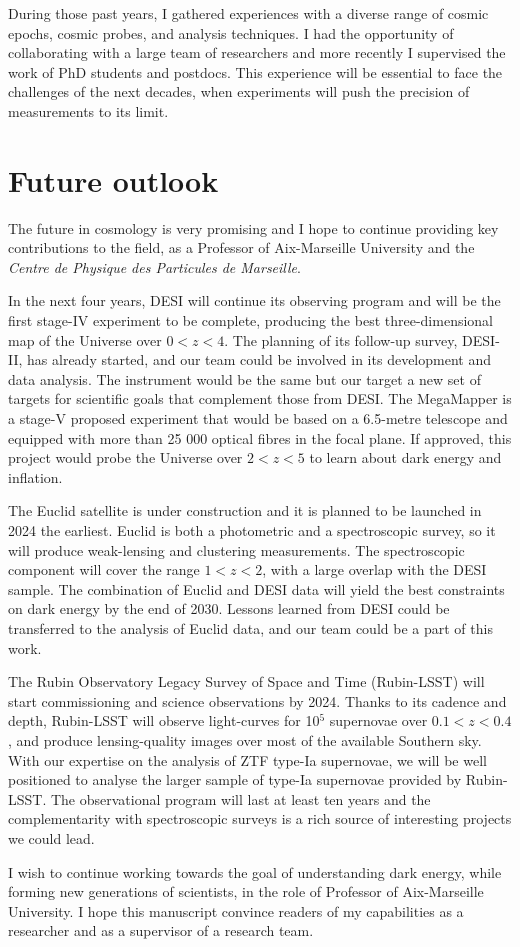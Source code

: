 During those past years, I gathered experiences with a diverse range of cosmic epochs, 
cosmic probes, and analysis techniques. I had the opportunity of collaborating with 
a large team of researchers and more recently I supervised the work of PhD students and postdocs. 
This experience will be essential to face the challenges of the next decades, 
when experiments will push the precision of measurements to its limit. 

\section{Future outlook}

The future in cosmology is very promising and I hope to continue providing key contributions to 
the field, as a Professor of Aix-Marseille University and the \emph{Centre de Physique des Particules de Marseille}. 

In the next four years, DESI will continue its observing program and will be 
the first stage-IV experiment to be complete, producing the best three-dimensional map 
of the Universe over $0 < z < 4$. 
The planning of its follow-up survey, DESI-II, has already started, and our team could be 
involved in its development and data analysis. The instrument would be the same but our target 
a new set of targets for scientific goals that complement those from DESI. 
The MegaMapper is a stage-V proposed experiment that would be based on a 6.5-metre telescope 
and equipped with more than 25 000 optical fibres in the focal plane. If approved, this 
project would probe the Universe over $2 < z < 5$ to learn about dark energy and inflation. 

The Euclid satellite is under construction and it is planned to be launched in 2024 the earliest. 
Euclid is both a photometric and a spectroscopic survey, so it will produce weak-lensing 
and clustering measurements. The spectroscopic component will cover the range $1< z < 2$, 
with a large overlap with the DESI sample. The combination of Euclid and DESI data will 
yield the best constraints on dark energy by the end of 2030.
Lessons learned from DESI could be transferred to the analysis of Euclid data, 
and our team could be a part of this work. 

The Rubin Observatory Legacy Survey of Space and Time (Rubin-LSST) will start 
commissioning and science observations by 2024. Thanks to its cadence and depth, 
Rubin-LSST will observe light-curves for 10$^5$ supernovae over $0.1< z < 0.4$,
and produce lensing-quality images over most of the available Southern sky. 
With our expertise on the analysis of ZTF type-Ia supernovae, 
we will be well positioned to analyse the larger sample of type-Ia supernovae 
provided by Rubin-LSST. The observational program will last at least ten years
and the complementarity with spectroscopic surveys is a rich source of 
interesting projects we could lead. 


I wish to continue working towards the goal of understanding dark energy,
while forming new generations of scientists, in the role of Professor of 
Aix-Marseille University. 
I hope this manuscript convince readers of my capabilities as a researcher
and as a supervisor of a research team. 
